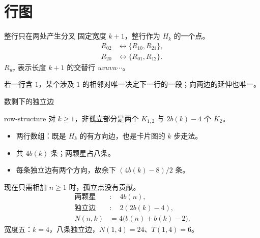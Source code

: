\documentclass{beamer}
\begin{document}
\section{行图}
\begin{frame}{整行只在两处产生分叉}
固定宽度 $k+1$，整行作为 $H_k$ 的一个点。
\[
\begin{aligned}
R_{02}&\longleftrightarrow\{R_{10},R_{21}\},\\
R_{20}&\longleftrightarrow\{R_{01},R_{12}\}.
\end{aligned}
\]
$R_{uv}$ 表示长度 $k+1$ 的交替行 $uvuvu\cdots$。
\medskip

若一行含 $1$，某个涉及 $1$ 的相邻对唯一决定下一行的一段；向两边的延伸也唯一。
\end{frame}
\begin{frame}{数剩下的独立边}
\begin{bookresult}{row-structure}
对 $k\geq1$，非孤立部分是两个 $K_{1,2}$ 与 $2b(k)-4$ 个 $K_2$。
\end{bookresult}
\begin{itemize}
\item 两行数组：既是 $H_k$ 的有方向边，也是卡片图的 $k$ 步走法。
\item 共 $4b(k)$ 条；两颗星占八条。
\item 每条独立边有两个方向，故余下 $(4b(k)-8)/2$ 条。
\end{itemize}
\end{frame}
\begin{frame}{现在只需相加}
$n\geq1$ 时，孤立点没有贡献。
\[
\begin{aligned}
\text{两颗星}&:\quad4b(n),\\
\text{独立边}&:\quad2(2b(k)-4),\\
N(n,k)&=4\bigl(b(n)+b(k)-2\bigr).
\end{aligned}
\]
宽度五：$k=4$，八条独立边，$N(1,4)=24$、$T(1,4)=6$。
\end{frame}
\end{document}
